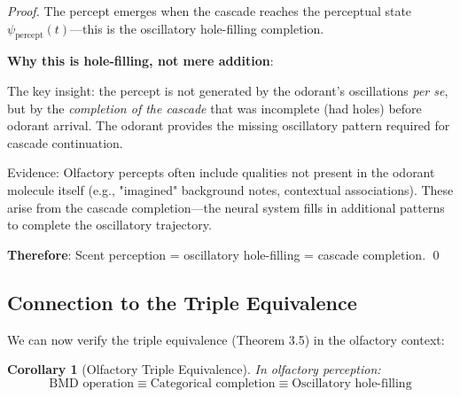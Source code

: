 \documentclass[12pt,a4paper]{article}
\newtheorem{corollary}{Corollary}
\begin{document}
\begin{proof}
The percept emerges when the cascade reaches the perceptual state $\psi_{\text{percept}}(t)$—this is the oscillatory hole-filling completion.

\textbf{Why this is hole-filling, not mere addition}:

The key insight: the percept is not generated by the odorant's oscillations \textit{per se}, but by the \textit{completion of the cascade} that was incomplete (had holes) before odorant arrival. The odorant provides the missing oscillatory pattern required for cascade continuation.

Evidence: Olfactory percepts often include qualities not present in the odorant molecule itself (e.g., "imagined" background notes, contextual associations). These arise from the cascade completion—the neural system fills in additional patterns to complete the oscillatory trajectory.

\textbf{Therefore}: Scent perception = oscillatory hole-filling = cascade completion. \qed
\end{proof}

\subsection{Connection to the Triple Equivalence}

We can now verify the triple equivalence (Theorem 3.5) in the olfactory context:

\begin{corollary}[Olfactory Triple Equivalence]
\label{cor:olfactory_triple}
In olfactory perception:
\begin{equation}
\text{BMD operation} \equiv \text{Categorical completion} \equiv \text{Oscillatory hole-filling}
\end{equation}
\end{corollary}
\end{document}
